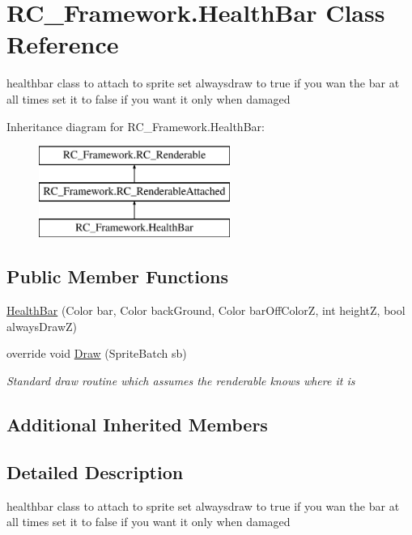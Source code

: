 \hypertarget{class_r_c___framework_1_1_health_bar}{}\section{R\+C\+\_\+\+Framework.\+Health\+Bar Class Reference}
\label{class_r_c___framework_1_1_health_bar}


healthbar class to attach to sprite set alwaysdraw to true if you wan the bar at all times set it to false if you want it only when damaged  


Inheritance diagram for R\+C\+\_\+\+Framework.\+Health\+Bar\+:\begin{figure}[H]
\begin{center}
\leavevmode
\includegraphics[height=3.000000cm]{class_r_c___framework_1_1_health_bar}
\end{center}
\end{figure}
\subsection*{Public Member Functions}
\begin{DoxyCompactItemize}
\item 
\mbox{\hyperlink{class_r_c___framework_1_1_health_bar_a1fadf428d30ca6fc622be62ae38c0fb4}{Health\+Bar}} (Color bar, Color back\+Ground, Color bar\+Off\+ColorZ, int heightZ, bool always\+DrawZ)
\item 
override void \mbox{\hyperlink{class_r_c___framework_1_1_health_bar_a8f53c56c52544e3c257db3d698fd2926}{Draw}} (Sprite\+Batch sb)
\begin{DoxyCompactList}\small\item\em Standard draw routine which assumes the renderable knows where it is \end{DoxyCompactList}\end{DoxyCompactItemize}
\subsection*{Additional Inherited Members}


\subsection{Detailed Description}
healthbar class to attach to sprite set alwaysdraw to true if you wan the bar at all times set it to false if you want it only when damaged 



